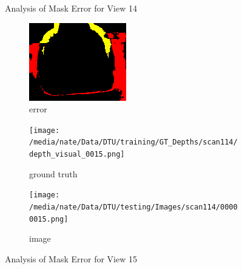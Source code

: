 \documentclass{article}
\begin{document}
\begin{figure}
\begin{subfigure}{0.3\textwidth}
		\label{fig:img14}
	\end{subfigure}
	\hfill
	\caption{Analysis of Mask Error for View 14}
	\label{fig:error_analys14}
\end{figure}\begin{figure}
	\centering
	\begin{subfigure}{0.3\textwidth}
		\centering
		\includegraphics[width=\textwidth]{./output/015_error.png}
		\caption{error}
		\label{fig:error15}
	\end{subfigure}
	\hfill
	\centering
	\begin{subfigure}{0.3\textwidth}
		\centering
		\texttt{[image: /media/nate/Data/DTU/training/GT\_Depths/scan114/depth\_visual\_0015.png]}
		\caption{ground truth}
		\label{fig:gt15}
	\end{subfigure}
	\hfill
	\centering
	\begin{subfigure}{0.3\textwidth}
		\centering
		\texttt{[image: /media/nate/Data/DTU/testing/Images/scan114/00000015.png]}
		\caption{image}
		\label{fig:img15}
	\end{subfigure}
	\hfill
	\caption{Analysis of Mask Error for View 15}
	\label{fig:error_analys15}
\end{figure}\begin{figure}
	\centering
	\begin{subfigure}{0.3\textwidth}
		\centering

\end{subfigure}
\end{figure}
\end{document}
